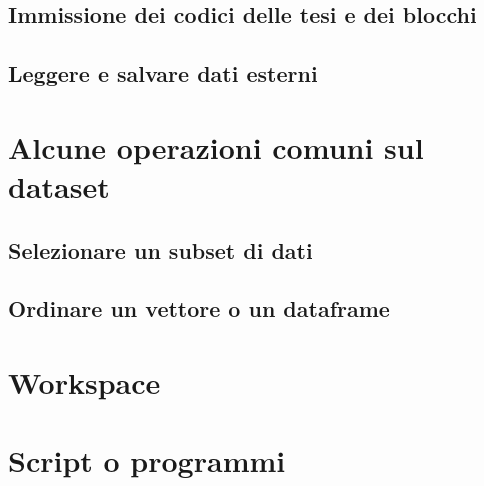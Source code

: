 \documentclass[a4paper,12pt,oneside]{book}
\begin{document}
\hypertarget{immissione-dei-codici-delle-tesi-e-dei-blocchi}{%
\subsection*{Immissione dei codici delle tesi e dei blocchi}\label{immissione-dei-codici-delle-tesi-e-dei-blocchi}}

\hypertarget{leggere-e-salvare-dati-esterni}{%
\subsection*{Leggere e salvare dati esterni}\label{leggere-e-salvare-dati-esterni}}

\hypertarget{alcune-operazioni-comuni-sul-dataset}{%
\section*{Alcune operazioni comuni sul dataset}\label{alcune-operazioni-comuni-sul-dataset}}

\hypertarget{selezionare-un-subset-di-dati}{%
\subsection*{Selezionare un subset di dati}\label{selezionare-un-subset-di-dati}}

\hypertarget{ordinare-un-vettore-o-un-dataframe}{%
\subsection*{Ordinare un vettore o un dataframe}\label{ordinare-un-vettore-o-un-dataframe}}

\hypertarget{workspace}{%
\section*{Workspace}\label{workspace}}

\hypertarget{script-o-programmi}{%
\section*{Script o programmi}\label{script-o-programmi}}
\end{document}
